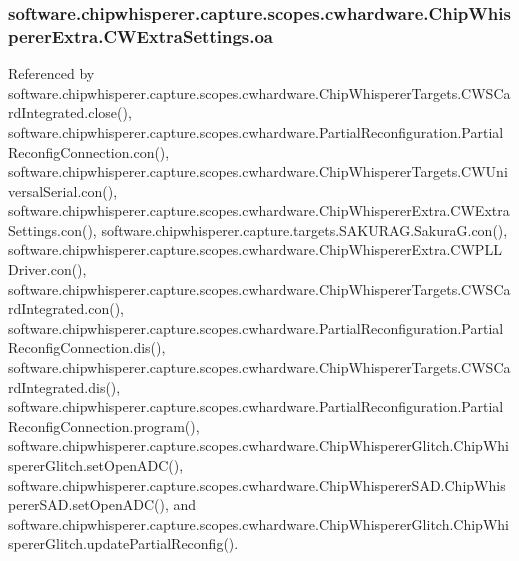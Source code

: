\subsubsection[{oa}]{\setlength{\rightskip}{0pt plus 5cm}software.\+chipwhisperer.\+capture.\+scopes.\+cwhardware.\+Chip\+Whisperer\+Extra.\+C\+W\+Extra\+Settings.\+oa}\label{classsoftware_1_1chipwhisperer_1_1capture_1_1scopes_1_1cwhardware_1_1ChipWhispererExtra_1_1CWExtraSettings_aef7bd134282f418aeabf768d7906088e}


Referenced by software.\+chipwhisperer.\+capture.\+scopes.\+cwhardware.\+Chip\+Whisperer\+Targets.\+C\+W\+S\+Card\+Integrated.\+close(), software.\+chipwhisperer.\+capture.\+scopes.\+cwhardware.\+Partial\+Reconfiguration.\+Partial\+Reconfig\+Connection.\+con(), software.\+chipwhisperer.\+capture.\+scopes.\+cwhardware.\+Chip\+Whisperer\+Targets.\+C\+W\+Universal\+Serial.\+con(), software.\+chipwhisperer.\+capture.\+scopes.\+cwhardware.\+Chip\+Whisperer\+Extra.\+C\+W\+Extra\+Settings.\+con(), software.\+chipwhisperer.\+capture.\+targets.\+S\+A\+K\+U\+R\+A\+G.\+Sakura\+G.\+con(), software.\+chipwhisperer.\+capture.\+scopes.\+cwhardware.\+Chip\+Whisperer\+Extra.\+C\+W\+P\+L\+L\+Driver.\+con(), software.\+chipwhisperer.\+capture.\+scopes.\+cwhardware.\+Chip\+Whisperer\+Targets.\+C\+W\+S\+Card\+Integrated.\+con(), software.\+chipwhisperer.\+capture.\+scopes.\+cwhardware.\+Partial\+Reconfiguration.\+Partial\+Reconfig\+Connection.\+dis(), software.\+chipwhisperer.\+capture.\+scopes.\+cwhardware.\+Chip\+Whisperer\+Targets.\+C\+W\+S\+Card\+Integrated.\+dis(), software.\+chipwhisperer.\+capture.\+scopes.\+cwhardware.\+Partial\+Reconfiguration.\+Partial\+Reconfig\+Connection.\+program(), software.\+chipwhisperer.\+capture.\+scopes.\+cwhardware.\+Chip\+Whisperer\+Glitch.\+Chip\+Whisperer\+Glitch.\+set\+Open\+A\+D\+C(), software.\+chipwhisperer.\+capture.\+scopes.\+cwhardware.\+Chip\+Whisperer\+S\+A\+D.\+Chip\+Whisperer\+S\+A\+D.\+set\+Open\+A\+D\+C(), and software.\+chipwhisperer.\+capture.\+scopes.\+cwhardware.\+Chip\+Whisperer\+Glitch.\+Chip\+Whisperer\+Glitch.\+update\+Partial\+Reconfig().

\hypertarget{classsoftware_1_1chipwhisperer_1_1capture_1_1scopes_1_1cwhardware_1_1ChipWhispererExtra_1_1CWExtraSettings_ae0048e98476242ff7aee6789d65b41a1}{}
